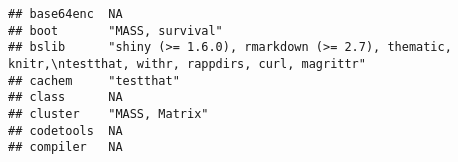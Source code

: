 \documentclass[
]{article}
\begin{document}
\begin{verbatim}
## base64enc  NA                                                                                                                                                                                                                                                                                                                                                 
## boot       "MASS, survival"                                                                                                                                                                                                                                                                                                                                   
## bslib      "shiny (>= 1.6.0), rmarkdown (>= 2.7), thematic, knitr,\ntestthat, withr, rappdirs, curl, magrittr"                                                                                                                                                                                                                                                
## cachem     "testthat"                                                                                                                                                                                                                                                                                                                                         
## class      NA                                                                                                                                                                                                                                                                                                                                                 
## cluster    "MASS, Matrix"                                                                                                                                                                                                                                                                                                                                     
## codetools  NA                                                                                                                                                                                                                                                                                                                                                 
## compiler   NA                                                                                                                                                                                                                                                                                                                                                 

\end{verbatim}
\end{document}
